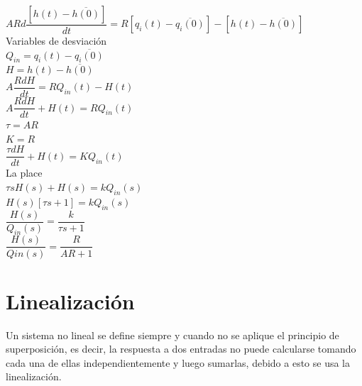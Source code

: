 \documentclass[a4paper,12pt,twoside]{proyectotanquesecci}
\begin{document}
$ARd\dfrac {\left[ h\left( t\right) -\overline {h\left( 0\right) }\right] }{dt}=R\left[ q_{i}\left( t\right) -\overline {q_{i}\left( 0\right) }\right] -\left[ h\left( t\right) -\overline {h\left( 0\right) }\right]$ \\

Variables de desviación \\
$Q_{in}=q_{i}\left( t\right) -\overline {q_{i}\left( 0\right) }$ \\
$H=h\left( t\right) -\overline {h\left( 0\right) }$ \\

$A\dfrac {RdH}{dt}=RQ_{in}\left( t\right) -H\left( t\right)$ \\
$A\dfrac {RdH}{dt}+H\left( t\right) =RQ_{in}\left( t\right)$ \\
$\tau =AR$ \\
$K=R$ \\

$\dfrac {\tau dH}{dt}+H\left( t\right) =KQ_{in}\left( t\right)$ \\

La place \\
$\tau sH\left( s\right) +H\left( s\right) =kQ_{in}\left( s\right)$ \\
$H\left( s\right) \left[ \tau s+1\right] =kQ_{in}\left( s\right)$ \\
$\dfrac {H\left( s\right) }{Q_{in}\left( s\right) }=\dfrac {k}{\tau s+1}$ \\
$\dfrac {H\left( s\right) }{Qin\left( s\right) }=\dfrac {R}{AR+1}$ \\


\newpage




\section{Linealización}

Un sistema no lineal se define siempre y cuando no se aplique el principio de superposición, es decir, la respuesta a dos entradas no puede calcularse tomando cada una de ellas independientemente y luego sumarlas, debido a esto se usa la linealización.\\

\end{document}
